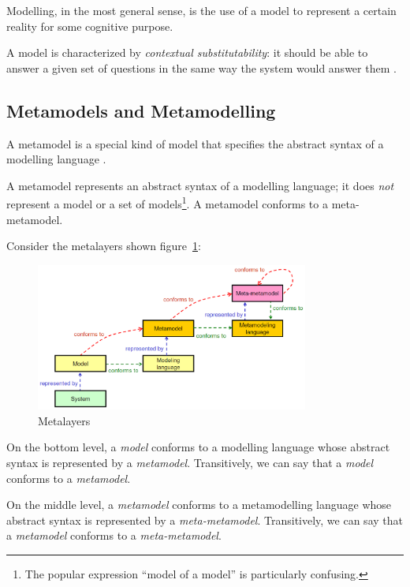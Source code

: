 Modelling, in the most general sense, is the use of a model to represent a certain reality for some cognitive purpose.

A model is characterized by \textit{contextual substitutability}: it should be able to answer a given set of questions in the same way the system would answer them \cite{Genova09}.

\subsection{Metamodels and Metamodelling}

A metamodel is a special kind of model that specifies the abstract syntax of a modelling language \cite{OMG-MDA-Foundation-Model}.

A metamodel represents an abstract syntax of a modelling language; it does \textit{not} represent a model or a set of models\footnote{The popular expression ``model of a model'' is particularly confusing.}.
A metamodel conforms to a meta-metamodel.

Consider the metalayers shown figure~\ref{figure:metalayers}:

\begin{figure}[h]
	\centering
	\includegraphics[width=0.8\textwidth]{images/metalayers.png}
	\caption{Metalayers \cite{Genova09}}
	\label{figure:metalayers}
\end{figure}

On the bottom level, a \textit{model} conforms to a modelling language whose abstract syntax is represented by a \textit{metamodel}.
Transitively, we can say that a \textit{model} conforms to a \textit{metamodel}.

On the middle level, a \textit{metamodel} conforms to a metamodelling language whose abstract syntax is represented by a \textit{meta-metamodel}.
Transitively, we can say that a \textit{metamodel} conforms to a \textit{meta-metamodel}.

